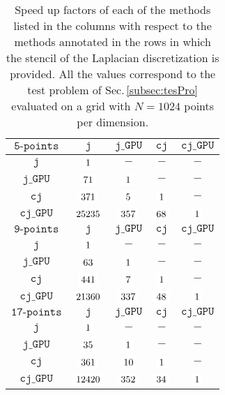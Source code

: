 \documentclass[preprint,12pt]{elsarticle}
\begin{document}
\begin{table}
\centering
\begin{tabular}{c|cccc}
    \hline
    $\texttt{5-points}$ & $\texttt{j}$ & $\texttt{j\_GPU}$ & $\texttt{cj}$ & 
$\texttt{cj\_GPU}$  \\ \hline
    $\texttt{j}$ & $\colorbox{white}{1}$  & $-$ & $-$ & $-$ \\ 
    $\texttt{j\_GPU}$ & $\colorbox{white}{71} $  & $\colorbox{white}{1}$ & $-$ & $-$ \\ 
    $\texttt{cj}$ & $\colorbox{white}{371}$ & $\colorbox{white}{5} $ & $\colorbox{white}{1}$ & 
$-$ \\
    $\texttt{cj\_GPU}$ & $\colorbox{white}{25235} $ & $\colorbox{white}{357}  
$ & $\colorbox{white}{68}$ & $\colorbox{white}{1}$ \\  
    \hline
    $\texttt{9-points}$ & $\texttt{j}$ & $\texttt{j\_GPU}$ & $\texttt{cj}$ & 
$\texttt{cj\_GPU}$  \\ \hline
    $\texttt{j}$ & $\colorbox{white}{1}$  & $-$ & $-$ & $-$ \\ 
    $\texttt{j\_GPU}$ & $\colorbox{white}{63}$  & $\colorbox{white}{1}$ & $-$ & $-$ \\ 
    $\texttt{cj}$ & $\colorbox{white}{441} $ & $\colorbox{white}{7} $ & $\colorbox{white}{1}$ & 
$-$ \\
    $\texttt{cj\_GPU}$ & $\colorbox{white}{21360} $ & $\colorbox{white}{337} $ 
& $\colorbox{white}{48}$ & $\colorbox{white}{1}$ \\ 
    \hline
    $\texttt{17-points}$ & $\texttt{j}$ & $\texttt{j\_GPU}$ & $\texttt{cj}$ & 
$\texttt{cj\_GPU}$  \\ \hline
    $\texttt{j}$ & $\colorbox{white}{1}$  & $-$ & $-$ & $-$ \\ 
    $\texttt{j\_GPU}$ & $\colorbox{white}{35} $  & $\colorbox{white}{1}$ & $-$ & $-$ \\ 
    $\texttt{cj}$ & $\colorbox{white}{361} $ & $\colorbox{white}{10} $ & $\colorbox{white}{1}$ & 
$-$ \\
    $\texttt{cj\_GPU}$ & $\colorbox{white}{12420} $ & $\colorbox{white}{352} $ 
& $\colorbox{white}{34} $ & $\colorbox{white}{1}$ \\
    \hline
  \end{tabular}
  \caption{Speed up factors of each of the methods listed in the
      columns with respect to the methods annotated in the rows in which
      the stencil of the Laplacian discretization is provided. All the
      values correspond to the test problem of Sec.\,\mbox{\ref{subsec:tesPro}}
      evaluated on a grid with $N=1024$ points per dimension.}
\label{tab:tab01}
\end{table}
\end{document}
